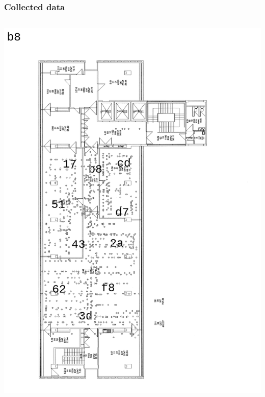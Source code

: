 \documentclass{beamer}
\begin{document}
\begin{frame}
\frametitle{Collected data}
\begin{columns}
\includegraphics[width=\linewidth]{images/b8_read.png}

\end{columns}
\end{frame}
\end{document}
